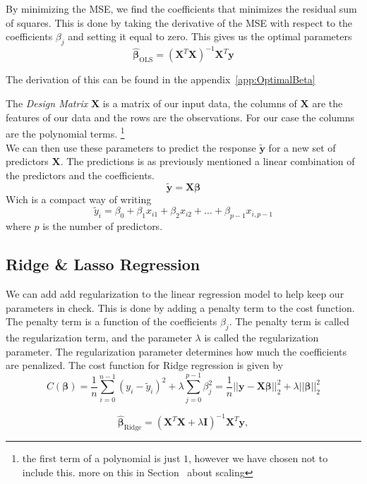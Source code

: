 \documentclass[twoside,11pt]{report}
\begin{document}
By minimizing the MSE, we find the coefficients that minimizes the residual sum of squares. This is done by taking the derivative of the
MSE with respect to the coefficients $\beta_j$ and setting it equal to zero. This gives us the optimal parameters
$$
\hat{\boldsymbol{\beta}}_{\mathrm{OLS}} = \left(\mathbf{X}^T\mathbf{X}\right)^{-1}\mathbf{X}^T\mathbf{y}
$$
\begin{center}
    The derivation of this can be found in the appendix~\ref{app:OptimalBeta} 
\end{center}
The \emph{Design Matrix} $\mathbf{X}$ is a matrix of our input data, the columns of $\mathbf{X}$ are the features of our 
data and the rows are the observations. For our case the columns are the polynomial terms. \footnote{the first
term of a polynomial is just $1$, however we have chosen not to include this. more on this in Section~ 
about scaling}\\ 
We can then use these parameters to predict the response $\tilde{\mathbf{y}}$ for a new set of predictors $\mathbf{X}$.
The predictions is as previously mentioned a linear combination of the predictors and the coefficients.
$$
\tilde{\mathbf{y}} = \mathbf{X}\boldsymbol{\beta}
$$
Wich is a compact way of writing
$$
\tilde{y}_i = \beta_0 + \beta_1 x_{i1} + \beta_2 x_{i2} + \dots + \beta_{p-1} x_{i,p-1}
$$
where $p$ is the number of predictors.\\

\subsection{Ridge \& Lasso Regression}
\label{sec:ridge}

We can add add regularization to the linear regression model to help keep our parameters in check. 
This is done by adding a penalty term to the cost function. The penalty term is a function of the coefficients $\beta_j$. 
The penalty term is called the regularization term, and the parameter $\lambda$ is called the regularization parameter. 
The regularization parameter determines how much the coefficients are penalized. The cost function for Ridge regression is given by
$$
C(\mathbf{\beta}) = \frac{1}{n}\sum_{i=0}^{n-1}(y_i-\tilde{y}_i)^2 + \lambda\sum_{j=0}^{p-1}\beta_j^2  
=\frac{1}{n}\vert\vert \mathbf{y}-\mathbf{X}\mathbf{\beta}\vert\vert_2^2 + \lambda\vert\vert\mathbf{\beta}\vert\vert_2^2
$$




$$
\hat{\mathbf{\beta}}_{\mathrm{Ridge}} = \left(\mathbf{X}^T\mathbf{X}+\lambda\mathbf{I}\right)^{-1}\mathbf{X}^T\mathbf{y},
$$
\end{document}
